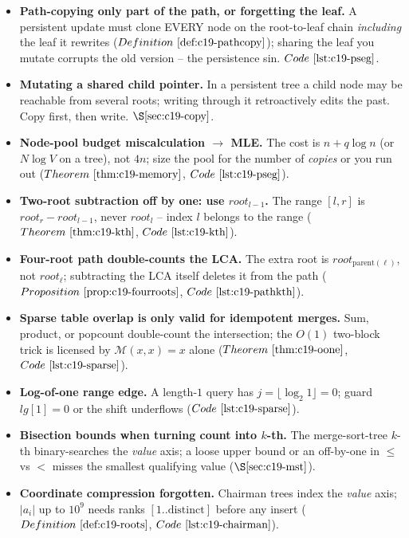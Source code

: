 
\begin{itemize}[nosep, leftmargin=1.4em]
  \item \textbf{Path-copying only part of the path, or forgetting the leaf.} A persistent
        update must clone EVERY node on the root-to-leaf chain \emph{including} the leaf it
        rewrites (\(\defref{c19-pathcopy}\)); sharing the leaf you mutate corrupts the old
        version -- the persistence sin. \(\coderef{c19-pseg}\).
  \item \textbf{Mutating a shared child pointer.} In a persistent tree a child node may be
        reachable from several roots; writing through it retroactively edits the past. Copy
        first, then write. \(\secref{c19-copy}\).
  \item \textbf{Node-pool budget miscalculation \(\to\) MLE.} The cost is
        \(n + q\log n\) (or \(N\log V\) on a tree), not \(4n\); size the pool for the number
        of \emph{copies} or you run out (\(\thmref{c19-memory}\), \(\coderef{c19-pseg}\)).
  \item \textbf{Two-root subtraction off by one: use \(\mathit{root}_{l-1}\).} The range
        \([l,r]\) is \(\mathit{root}_r - \mathit{root}_{l-1}\), never \(\mathit{root}_l\) --
        index \(l\) belongs to the range (\(\thmref{c19-kth}\), \(\coderef{c19-kth}\)).
  \item \textbf{Four-root path double-counts the LCA.} The extra root is
        \(\mathit{root}_{\mathrm{parent}(\ell)}\), not \(\mathit{root}_\ell\); subtracting
        the LCA itself deletes it from the path (\(\propref{c19-fourroots}\),
        \(\coderef{c19-pathkth}\)).
  \item \textbf{Sparse table overlap is only valid for idempotent merges.} Sum, product, or
        popcount double-count the intersection; the \(O(1)\) two-block trick is licensed by
        \(\mathcal{M}(x,x)=x\) alone (\(\thmref{c19-oone}\), \(\coderef{c19-sparse}\)).
  \item \textbf{Log-of-one range edge.} A length-\(1\) query has \(j=\lfloor\log_2 1\rfloor=0\);
        guard \(\mathit{lg}[1]=0\) or the shift underflows (\(\coderef{c19-sparse}\)).
  \item \textbf{Bisection bounds when turning count into \(k\)-th.} The merge-sort-tree
        \(k\)-th binary-searches the \emph{value} axis; a loose upper bound or an
        off-by-one in \(\le\) vs \(<\) misses the smallest qualifying value
        (\(\secref{c19-mst}\)).
  \item \textbf{Coordinate compression forgotten.} Chairman trees index the \emph{value}
        axis; \(|a_i|\) up to \(10^9\) needs ranks \([1..\text{distinct}]\) before any insert
        (\(\defref{c19-roots}\), \(\coderef{c19-chairman}\)).
\end{itemize}

